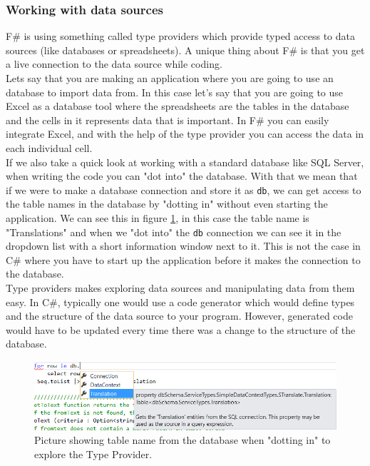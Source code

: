 \documentclass[12pt, a4paper]{article}
\newcommand{\code}[1]{{\small \texttt{#1}}}
\begin{document}
\newpage

\subsubsection{Working with data sources}

F\# is using something called type providers which provide typed access to data sources (like databases or spreadsheets). A unique thing about F\# is that you get a live connection to the data source while coding.\\

Lets say that you are making an application where you are going to use an database to import data from. In this case let's say that you are going to use Excel as a database tool where the spreadsheets are the tables in the database and the cells in it represents data that is important. In F\# you can easily integrate Excel, and with the help of the type provider you can access the data in each individual cell.\\

If we also take a quick look at working with a standard database like SQL Server, when writing the code you can "dot into" the database. With that we mean that if we were to make a database connection and store it as \code{db}, we can get access to the table names in the database by "dotting in" without even starting the application. We can see this in figure \ref{fig:DotInTool}, in this case the table name is "Translations" and when we "dot into" the \code{db} connection we can see it in the dropdown list with a short information window next to it. This is not the case in C\# where you have to start up the application before it makes the connection to the database.\\

Type providers makes exploring data sources and manipulating data from them easy. In C\#, typically one would use a code generator which would define types and the structure of the data source to your program. However, generated code would have to be updated every time there was a change to the structure of the database.

\begin{figure}[!h]
    \includegraphics[width=\textwidth]{visualstudio1}
    \centering
    \caption{Picture showing table name from the database when "dotting in" to explore the Type Provider.}
    \label{fig:DotInTool}
\end{figure}
\end{document}
